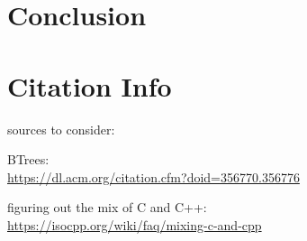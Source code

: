 \documentclass[twocolumn]{article}
\begin{document}
\section{Conclusion}

\section{Citation Info}


sources to consider:

BTrees:\\
\url{https://dl.acm.org/citation.cfm?doid=356770.356776}

figuring out the mix of C and C++:\\
\url{https://isocpp.org/wiki/faq/mixing-c-and-cpp}
\end{document}
